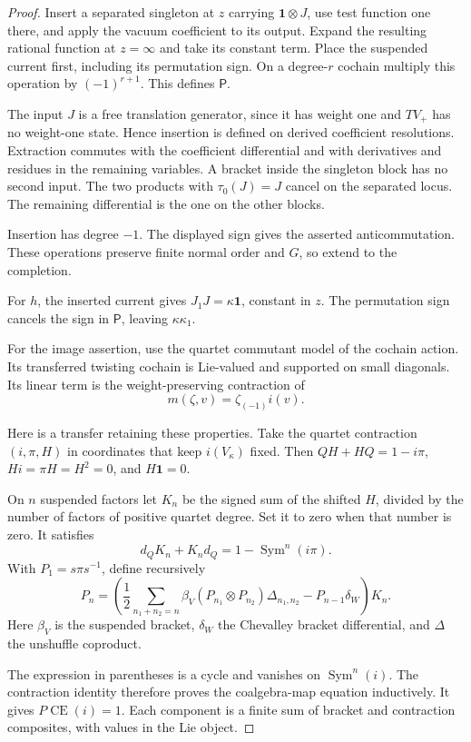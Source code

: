 \begin{proof}
Insert a separated singleton at $z$ carrying
$\mathbf1\otimes J$, use test function one there, and apply
the vacuum coefficient to its output. Expand the resulting
rational function at $z=\infty$ and take its constant term.
Place the suspended current first, including its permutation
sign. On a degree-$r$ cochain multiply this operation by
$(-1)^{r+1}$. This defines $\mathsf P$.

The input $J$ is a free translation generator, since it has
weight one and $TV_+$ has no weight-one state.
Hence insertion is defined on derived coefficient resolutions.
Extraction commutes with the coefficient differential and
with derivatives and residues in the remaining variables.
A bracket inside the singleton block has no second input.
The two products with $\tau_0(J)=J$ cancel on the separated
locus. The remaining differential is the one on the other
blocks.

Insertion has degree $-1$. The displayed sign gives
the asserted anticommutation. These operations preserve
finite normal order and $G$, so extend to the completion.

For $h$, the inserted current gives $J_1J=\kappa\mathbf1$,
constant in $z$. The permutation sign cancels the sign in
$\mathsf P$, leaving $\kappa\kappa_1$.

For the image assertion, use the quartet commutant model
of the cochain action. Its transferred twisting cochain is
Lie-valued and supported on small diagonals. Its linear term
is the weight-preserving contraction of
\[
 m(\zeta,v)=\zeta_{(-1)}i(v).
\]

Here is a transfer retaining these properties.
Take the quartet contraction $(i,\pi,H)$ in coordinates
that keep $i(V_\kappa)$ fixed. Then
$QH+HQ=1-i\pi$, $Hi=\pi H=H^2=0$, and $H\mathbf1=0$.

On $n$ suspended factors let $K_n$ be the signed sum
of the shifted $H$, divided by the number of factors
of positive quartet degree. Set it to zero when that
number is zero. It satisfies
\[
 d_QK_n+K_nd_Q=1-\operatorname{Sym}^n(i\pi).
\]
With $P_1=s\pi s^{-1}$, define recursively
\[
 P_n=\left(
 \frac12\sum_{n_1+n_2=n}
 \beta_V(P_{n_1}\otimes P_{n_2})\Delta_{n_1,n_2}
 -P_{n-1}\delta_W\right)K_n.
\]
Here $\beta_V$ is the suspended bracket, $\delta_W$
the Chevalley bracket differential, and $\Delta$ the
unshuffle coproduct.

The expression in parentheses is
a cycle and vanishes on $\operatorname{Sym}^n(i)$.
The contraction identity therefore proves the coalgebra-map
equation inductively. It gives $P\operatorname{CE}(i)=1$.
Each component is a finite sum of bracket and contraction
composites, with values in the Lie object.


\end{proof}
